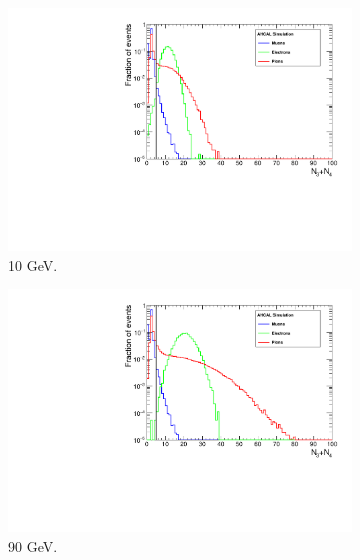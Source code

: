 \begin{figure}[htbp!]
	\begin{subfigure}[t]{0.5\textwidth}
		\centering
		\includegraphics[width=1\linewidth]{../Thesis_Plots/Timing/Pions/Plots/SelectionCut_N3N4_10GeV}
		\caption{10 GeV.} \label{fig:pi10GeV_N3N4}
	\end{subfigure}
	\hfill
	\begin{subfigure}[t]{0.5\textwidth}
		\centering
		\includegraphics[width=1\linewidth]{../Thesis_Plots/Timing/Pions/Plots/SelectionCut_N3N4_90GeV}
		\caption{90 GeV.} \label{fig:pi90GeV_N3N4}
	\end{subfigure}
	\hfill
	\begin{subfigure}[t]{0.5\textwidth}
		\centering

\end{subfigure}
\end{figure}
